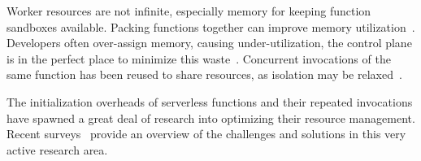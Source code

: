 Worker resources are not infinite, especially memory for keeping function sandboxes available.
Packing functions together can improve memory utilization~\cite{akhtar_cose_2020}.
Developers often over-assign memory, causing under-utilization, the control plane is in the perfect place to minimize this waste~\cite{eismann2021sizeless, mvondo2021ofc}.
Concurrent invocations of the same function has been reused to share resources, as isolation may be relaxed~\cite{stojkovic2023mxfaas}.

The initialization overheads of serverless functions and their repeated invocations have spawned a great deal of research into optimizing their resource management.
Recent surveys~\cite{faas-survey-jan-2022, raza2021sok, eismann2020serverless, hassan2021survey, mampage2021holistic} provide an overview of the challenges and solutions in this very active research area. 




